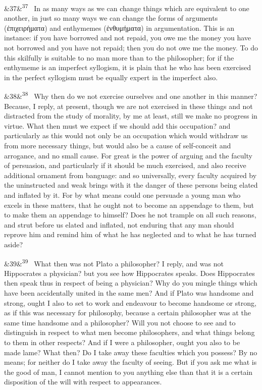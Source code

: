 \documentclass[12pt]{article}
\newcommand{\para}[1][]{\par\noindent\ifx&#1&\else\textsuperscript{\footnotesize #1}~\fi}
\begin{document}
\para[37] In as many ways as we can change things which are equivalent to one another, in just so many ways we can change the forms of arguments (ἐπιχειρήματα) and enthymemes (ἐνθυμήματα) in argumentation. This is an instance: if you have borrowed and not repaid, you owe me the money you have not borrowed and you have not repaid; then you do not owe me the money. To do this skilfully is suitable to no man more than to the philosopher; for if the enthymeme is an imperfect syllogism, it is plain that he who has been exercised in the perfect syllogism must be equally expert in the imperfect also.

\para[38] Why then do we not exercise ourselves and one another in this manner? Because, I reply, at present, though we are not exercised in these things and not distracted from the study of morality, by me at least, still we make no progress in virtue. What then must we expect if we should add this occupation? and particularly as this would not only be an occupation which would withdraw us from more necessary things, but would also be a cause of self-conceit and arrogance, and no small cause. For great is the power of arguing and the faculty of persuasion, and particularly if it should be much exercised, and also receive additional ornament from banguage: and so universally, every faculty acquired by the uninstructed and weak brings with it the danger of these persons being elated and inflated by it. For by what means could one persuade a young man who excels in these matters, that he ought not to become an appendage to them, but to make them an appendage to himself? Does he not trample on all such reasons, and strut before us elated and inflated, not enduring that any man should reprove him and remind him of what he has neglected and to what he has turned aside?

\para[39] What then was not Plato a philosopher? I reply, and was not Hippocrates a physician? but you see how Hippocrates speaks. Does Hippocrates then speak thus in respect of being a physician? Why do you mingle things which have been accidentally united in the same men? And if Plato was handsome and strong, ought I also to set to work and endeavour to become handsome or strong, as if this was necessary for philosophy, because a certain philosopher was at the same time handsome and a philosopher? Will you not choose to see and to distinguish in respect to what men become philosophers, and what things belong to them in other respects? And if I were a philosopher, ought you also to be made lame? What then? Do I take away these faculties which you possess? By no means; for neither do I take away the faculty of seeing. But if you ask me what is the good of man, I cannot mention to you anything else than that it is a certain disposition of the will with respect to appearances.
\end{document}
